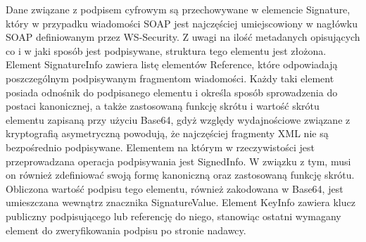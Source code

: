 Dane związane z podpisem cyfrowym są przechowywane w elemencie Signature\cite{Eastlake:08:XSS}, który w przypadku wiadomości SOAP jest najczęściej umiejscowiony w nagłówku SOAP definiowanym przez WS-Security. Z uwagi na ilość metadanych opisujących co i w jaki sposób jest podpisywane, struktura tego elementu jest złożona. Element SignatureInfo zawiera listę elementów Reference, które odpowiadają poszczególnym podpisywanym fragmentom wiadomości. Każdy taki element posiada odnośnik do podpisanego elementu i określa sposób sprowadzenia do postaci kanonicznej, a także zastosowaną funkcję skrótu i wartość skrótu elementu zapisaną przy użyciu Base64, gdyż względy wydajnościowe związane z kryptografią asymetryczną powodują, że najczęściej fragmenty XML nie są bezpośrednio podpisywane. Elementem na którym w rzeczywistości jest przeprowadzana operacja podpisywania jest SignedInfo. W związku z tym, musi on również zdefiniować swoją formę kanoniczną oraz zastosowaną funkcję skrótu. Obliczona wartość podpisu tego elementu, również zakodowana w Base64,  jest umieszczana wewnątrz znacznika SignatureValue. Element KeyInfo zawiera klucz publiczny podpisującego lub referencję do niego, stanowiąc ostatni wymagany element do zweryfikowania podpisu po stronie nadawcy.

